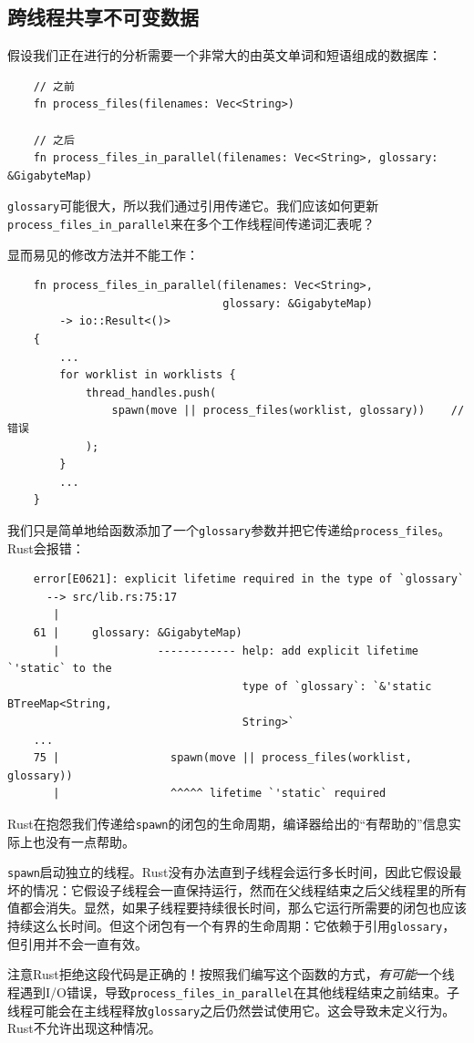 \subsection{跨线程共享不可变数据}
假设我们正在进行的分析需要一个非常大的由英文单词和短语组成的数据库：
\begin{verbatim}
    // 之前
    fn process_files(filenames: Vec<String>)

    // 之后
    fn process_files_in_parallel(filenames: Vec<String>, glossary: &GigabyteMap)
\end{verbatim}

\texttt{glossary}可能很大，所以我们通过引用传递它。我们应该如何更新\texttt{process\_files\_in\_parallel}来在多个工作线程间传递词汇表呢？

显而易见的修改方法并不能工作：
\begin{verbatim}
    fn process_files_in_parallel(filenames: Vec<String>,
                                 glossary: &GigabyteMap)
        -> io::Result<()>
    {
        ...
        for worklist in worklists {
            thread_handles.push(
                spawn(move || process_files(worklist, glossary))    // 错误
            );
        }
        ...
    }
\end{verbatim}

我们只是简单地给函数添加了一个\texttt{glossary}参数并把它传递给\texttt{process\_files}。Rust会报错：
\begin{verbatim}
    error[E0621]: explicit lifetime required in the type of `glossary`
      --> src/lib.rs:75:17
       |
    61 |     glossary: &GigabyteMap)
       |               ------------ help: add explicit lifetime `'static` to the 
                                    type of `glossary`: `&'static BTreeMap<String,
                                    String>`
    ...
    75 |                 spawn(move || process_files(worklist, glossary))
       |                 ^^^^^ lifetime `'static` required
\end{verbatim}

Rust在抱怨我们传递给\texttt{spawn}的闭包的生命周期，编译器给出的“有帮助的”信息实际上也没有一点帮助。

\texttt{spawn}启动独立的线程。Rust没有办法直到子线程会运行多长时间，因此它假设最坏的情况：它假设子线程会一直保持运行，然而在父线程结束之后父线程里的所有值都会消失。显然，如果子线程要持续很长时间，那么它运行所需要的闭包也应该持续这么长时间。但这个闭包有一个有界的生命周期：它依赖于引用\texttt{glossary}，但引用并不会一直有效。

注意Rust拒绝这段代码是正确的！按照我们编写这个函数的方式，\emph{有可能}一个线程遇到I/O错误，导致\texttt{process\_files\_in\_parallel}在其他线程结束之前结束。子线程可能会在主线程释放\texttt{glossary}之后仍然尝试使用它。这会导致未定义行为。Rust不允许出现这种情况。

